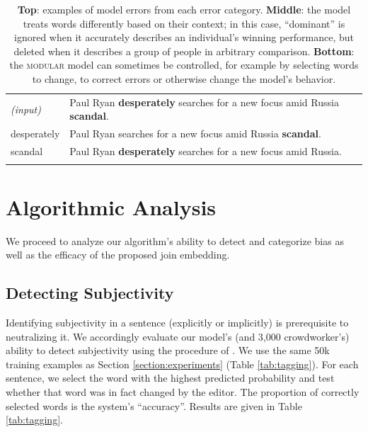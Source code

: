 \begin{table}[htb]
\begin{tabular}{ll}
\multicolumn{1}{l|}{ \emph{(input)}} & Paul Ryan \textbf{desperately} searches for a new focus amid Russia \textbf{scandal}. \\
 \multicolumn{1}{l|}{desperately} & Paul Ryan searches for a new focus amid Russia \textbf{scandal}. \\
 \multicolumn{1}{l|}{scandal} & Paul Ryan \textbf{desperately} searches for a new focus amid Russia. \\  \\  
\end{tabular}
\vspace{-0.2cm}
\caption{\textbf{Top}: examples of model errors from each error category. \textbf{Middle}: the model treats words differently based on their context; in this case, ``dominant'' is ignored when it accurately describes an individual's winning performance, but deleted when it describes a group of people in arbitrary comparison. \textbf{Bottom}: the \textsc{modular} model can sometimes be controlled, for example by selecting words to change, to correct errors or otherwise change the model's behavior.}
\label{tab:error-examples}
\end{table}

\section{Algorithmic Analysis}


We proceed to analyze our algorithm's ability to detect and categorize bias as well as the efficacy of the proposed join embedding.



\subsection{Detecting Subjectivity}
\label{subsubsection:detection}

Identifying subjectivity in a sentence (explicitly or implicitly) is prerequisite to neutralizing it. We accordingly evaluate our model's (and 3,000 crowdworker's) ability to detect subjectivity using the procedure of \citet{recasens2013linguistic}. We use the same 50k training examples as Section \ref{section:experiments} (Table \ref{tab:tagging}). For each sentence, we select the word with the highest predicted probability and test whether that word was in fact changed by the editor. The proportion of correctly selected words is the system's ``accuracy''. Results are given in Table \ref{tab:tagging}.

